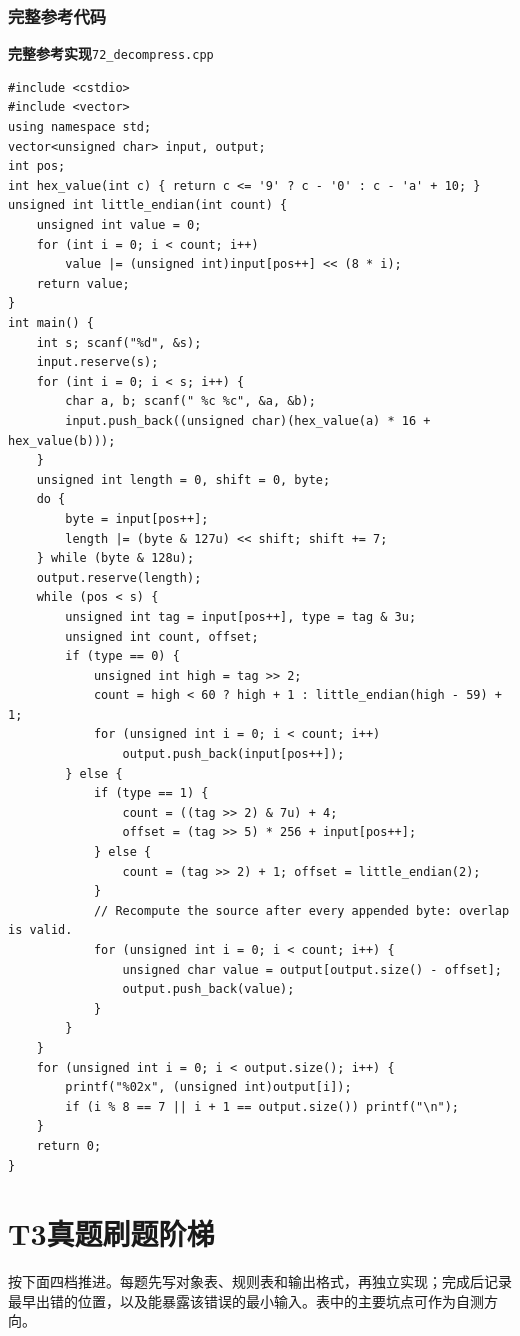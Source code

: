 \documentclass[UTF8,11pt,a4paper,fontset=none]{ctexart}
\begin{document}
\subsubsection{完整参考代码}
\par\noindent\begin{minipage}{\linewidth}
\textbf{完整参考实现}\quad\texttt{72\_decompress.cpp}
\begin{lstlisting}
#include <cstdio>
#include <vector>
using namespace std;
vector<unsigned char> input, output;
int pos;
int hex_value(int c) { return c <= '9' ? c - '0' : c - 'a' + 10; }
unsigned int little_endian(int count) {
    unsigned int value = 0;
    for (int i = 0; i < count; i++)
        value |= (unsigned int)input[pos++] << (8 * i);
    return value;
}
int main() {
    int s; scanf("%d", &s);
    input.reserve(s);
    for (int i = 0; i < s; i++) {
        char a, b; scanf(" %c %c", &a, &b);
        input.push_back((unsigned char)(hex_value(a) * 16 + hex_value(b)));
    }
    unsigned int length = 0, shift = 0, byte;
    do {
        byte = input[pos++];
        length |= (byte & 127u) << shift; shift += 7;
    } while (byte & 128u);
    output.reserve(length);
    while (pos < s) {
        unsigned int tag = input[pos++], type = tag & 3u;
        unsigned int count, offset;
        if (type == 0) {
            unsigned int high = tag >> 2;
            count = high < 60 ? high + 1 : little_endian(high - 59) + 1;
            for (unsigned int i = 0; i < count; i++)
                output.push_back(input[pos++]);
        } else {
            if (type == 1) {
                count = ((tag >> 2) & 7u) + 4;
                offset = (tag >> 5) * 256 + input[pos++];
            } else {
                count = (tag >> 2) + 1; offset = little_endian(2);
            }
            // Recompute the source after every appended byte: overlap is valid.
            for (unsigned int i = 0; i < count; i++) {
                unsigned char value = output[output.size() - offset];
                output.push_back(value);
            }
        }
    }
    for (unsigned int i = 0; i < output.size(); i++) {
        printf("%02x", (unsigned int)output[i]);
        if (i % 8 == 7 || i + 1 == output.size()) printf("\n");
    }
    return 0;
}
\end{lstlisting}
\end{minipage}\par


\section{T3真题刷题阶梯}
按下面四档推进。每题先写对象表、规则表和输出格式，再独立实现；完成后记录最早出错的位置，以及能暴露该错误的最小输入。表中的主要坑点可作为自测方向。
\end{document}
